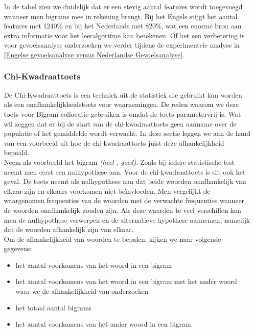 In de tabel zien we duidelijk dat er een stevig aantal features wordt toegevoegd wanneer men bigrams mee in rekening brengt. Bij het Engels stijgt het aantal features met 1240\% en bij het Nederlands met 820\%, wat een enorme bron aan extra informatie voor het leeralgoritme kan betekenen. Of het een verbetering is voor gevoelsanalyse onderzoeken we verder tijdens de experimentele analyse in \ref{Engelse gevoelsanalyse versus Nederlandse Gevoelsanalyse}.

\subsubsection{Chi-Kwadraattoets}\label{Chi-Kwadraattoest}

De Chi-Kwadraattoets is een techniek uit de statistiek die gebruikt  kan worden als een onafhankelijkheidstoets voor waarnemingen. De reden waarom we deze toets voor Bigram collocatie gebruiken is omdat de toets parametervrij is. Wat wil zeggen dat er bij de start van de chi-kwadraattoets geen aanname over de populatie of het gemiddelde wordt verwacht. In deze sectie leggen we aan de hand van een voorbeeld uit hoe de chi-kwadraattoets juist deze afhankelijkheid bepaald.\\
%
Neem als voorbeeld het bigram \textit{(heel , goed)}. Zoals bij iedere statistische test neemt men eerst een nulhypothese aan. Voor de chi-kwadraattoets is dit ook het geval. De toets neemt als nulhypothese aan dat beide woorden onafhankelijk van elkaar zijn en elkaars voorkomen niet be\"invloeden. Men vergelijkt de waargenomen frequenties van de woorden met de verwachte frequenties wanneer de woorden onafhankelijk zouden zijn. Als deze waarden te veel verschillen kan men de nulhypothese verwerpen en de alternatieve hypothese aannemen, namelijk dat de woorden afhankelijk zijn van elkaar. \\
\newline
%
Om de afhankelijkheid van woorden te bepalen, kijken we naar volgende gegevens:
\begin{itemize}
  \item het aantal voorkomens van het woord in een bigram
  \item het aantal voorkomens van het woord in een bigram met het ander woord waar we de afhankelijkheid van onderzoeken
  \item het totaal aantal bigrams
  \item het aantal voorkomens van het ander woord in een bigram. 
\end{itemize}
%
%
